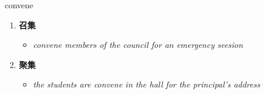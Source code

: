 
\begin{frame}
{\huge convene}
\begin{center}
\begin{enumerate}\Large
  \item \textbf{召集}
  \begin{itemize}
    \item \em{\Large{convene members of the council for an emergency seesion}}
  \end{itemize}
  \item \textbf{聚集}
  \begin{itemize}
    \item \em{\Large{the students are convene in the hall for the principal's address}}
  \end{itemize}
\end{enumerate}
\end{center}
\end{frame}
